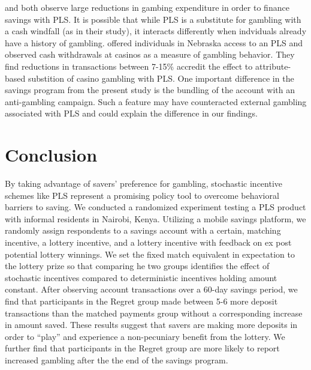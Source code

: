 \documentclass[11pt]{article}
\begin{document}
		\textcite{atalay_savings_2014} and \textcite{dizon_leveraging_2016} both observe large reductions in gambing expenditure in order to finance savings with PLS. It is possible that while PLS is a substitute for gambling with a cash windfall (as in their study), it interacts differently when indviduals already have a history of gambling. \textcite{cookson_when_2016} offered individuals in Nebraska access to an PLS and observed cash withdrawals at casinos as a measure of gambling behavior. They find reductions in transactions between 7-15\% accredit the effect to attribute-based substition of casino gambling with PLS. One important difference in the savings program from the present study is the bundling of the account with an anti-gambling campaign. Such a feature may have counteracted external gambling associated with PLS and could explain the difference in our findings.

		

\section{Conclusion} \label{sec:conclusion}

		By taking advantage of savers' preference for gambling, stochastic incentive schemes like PLS represent a promising policy tool to overcome behavioral barriers to saving. We conducted a randomized experiment testing a PLS product with informal residents in Nairobi, Kenya. Utilizing a mobile savings platform, we randomly assign respondents to a savings account with a certain, matching incentive, a lottery incentive, and a lottery incentive with feedback on ex post potential lottery winnings. We set the fixed match equivalent in expectation to the lottery prize so that comparing he two groups identifies the effect of stochastic incentives compared to deterministic incentives holding amount constant. After observing account transactions over a 60-day savings period, we find that participants in the Regret group made between 5-6 more deposit transactions than the matched payments group without a corresponding increase in amount saved. These results suggest that savers are making more deposits in order to ``play'' and experience a non-pecuniary benefit from the lottery. We further find that participants in the Regret group are more likely to report increased gambling after the the end of the savings program.
\end{document}
